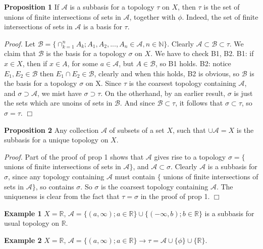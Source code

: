 \documentclass[12pt]{article}
\newcommand{\rarw}[0] { \rightarrow }
\newcommand{\nats}[0] { \mathbb{N}}
\newcommand{\reals}[0] { \mathbb{R}}
\newcommand{\A}[0] { \mathcal{A} }
\newcommand{\B}[0] { \mathcal{B} }
\begin{document}
\begin{flushleft} {\bf Proposition 1} If $\A$ is a subbasis for a topology $\tau$ on $X$, then $\tau$ is the set of unions of finite intersections of sets in $\A$, together with $\phi$. Indeed, the set of finite intersections of sets in $\A$ is a basis for $\tau$.
\end{flushleft}

\begin{flushleft} \emph{Proof.  } Let $\B = \{ \cap_{k=1}^n A_k; A_1, A_2, ..., A_n \in \A, n \in \nats \}$. Clearly $\A \subset \B \subset \tau$. We claim that $\B$ is the basis for a topology $\sigma$ on $X$. We have to check B1, B2. B1: if $x \in X$, then if $x \in A$, for some $a \in \A$, but $A \in \B$, so B1 holds. B2: notice $E_1, E_2 \in \B$ then $E_1 \cap E_2 \in \B$, clearly and when this holds, B2 is obvious, so $\B$ is the basis for a topology $\sigma$ on X. Since $\tau$ is the coarsest topology containing $\A$, and $\sigma \supset \A$, we mist have $\sigma \supset \tau$. On the otherhand, by an earlier result, $\sigma$ is just the sets which are unoins of sets in $\B$. And since $\B \subset \tau$, it follows that $\sigma \subset \tau$, so $\sigma = \tau$. $\Box$
\end{flushleft}

\begin{flushleft} {\bf Proposition 2} Any collection $\A$ of subsets of a set $X$, such that $\cup \A = X$ is the subbasis for a unique topology on $X$.
\end{flushleft}

\begin{flushleft} \emph{Proof.  } Part of the proof of prop 1 shows that $\A$ gives rise to a topology $\sigma = \{$ unions of finite intersections of sets in $\A \}$, and $\A \subset \sigma$. Clearly $\A$ is a subbasis for $\sigma$, since any topology containing $\A$ must contain  $\{$ unions of finite intersections of sets in $\A \}$, so contains $\sigma$. So $\sigma$ is the coarsest topology containing $\A$. The uniqueness is clear from the fact that $\tau = \sigma$ in the proof of prop 1. $\Box$
\end{flushleft}

\begin{flushleft} {\bf Example 1} $X = \reals$, $\A = \{ (a,\infty); a \in \reals \} \cup \{ (-\infty, b); b \in \reals \}$ is a subbasis for usual topology on $\reals$. 
\end{flushleft}

\begin{flushleft} {\bf Example 2} $X = \reals$, $\A = \{ (a, \infty); a \in \reals \} \rarw \tau = \A \cup \{ \phi \} \cup \{ \reals \} $.
\end{flushleft}
\end{document}

